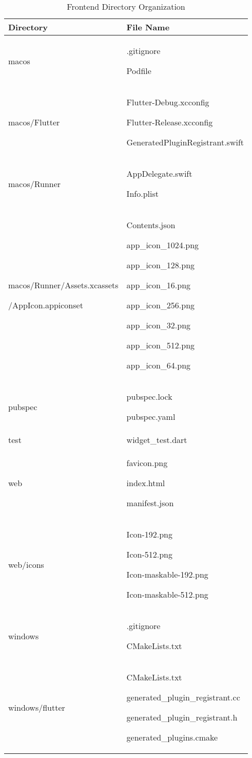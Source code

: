 \documentclass[conference]{IEEEtran}
\begin{document}
\begin{table}[h!]
\caption{Frontend Directory Organization}
\def\arraystretch{1.4} \small
\begin{tabular}{|p{4.1cm}|p{4.1cm}|}
    \hline
    Directory & File Name \\ \hline
    macos & .gitignore \par Podfile \\ \hline
    macos/Flutter & Flutter-Debug.xcconfig \par Flutter-Release.xcconfig \par GeneratedPluginRegistrant.swift \\ \hline
    macos/Runner & AppDelegate.swift \par Info.plist \\ \hline
    macos/Runner/Assets.xcassets \par /AppIcon.appiconset & Contents.json \par app\_icon\_1024.png \par app\_icon\_128.png \par app\_icon\_16.png \par app\_icon\_256.png \par app\_icon\_32.png \par app\_icon\_512.png \par app\_icon\_64.png \\ \hline
    pubspec & pubspec.lock \par pubspec.yaml \\ \hline
    test & widget\_test.dart \\ \hline
    web & favicon.png \par index.html \par manifest.json \\ \hline
    web/icons & Icon-192.png \par Icon-512.png \par Icon-maskable-192.png \par Icon-maskable-512.png \\ \hline
    windows & .gitignore \par CMakeLists.txt \\ \hline
    windows/flutter & CMakeLists.txt \par generated\_plugin\_registrant.cc \par generated\_plugin\_registrant.h \par generated\_plugins.cmake \\ \hline
\end{tabular}
\end{table}
\end{document}

